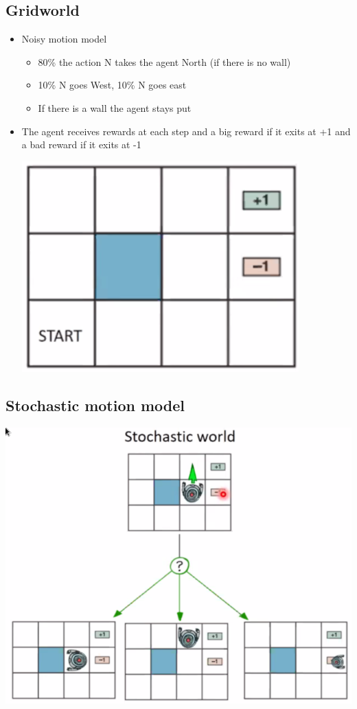 \documentclass[11pt]{article}
\begin{document}
\subsection{Gridworld}
\label{sec:orgb357dd0}
\begin{itemize}
\item Noisy motion model
\begin{itemize}
\item 80\% the action N takes the agent North (if there is no wall)
\item 10\% N goes West, 10\% N goes east
\item If there is a wall the agent stays put
\end{itemize}
\item The agent receives rewards at each step and a big reward if it exits at +1 and a bad reward if it exits at -1
\begin{center}
\includegraphics[width=.9\linewidth]{images/2020-09-03_17-54-54_screenshot.png}
\end{center}
\end{itemize}
\subsection{Stochastic motion model}
\label{sec:org61c2e1b}
\begin{center}
\includegraphics[width=.9\linewidth]{images/2020-09-03_17-58-54_screenshot.png}
\end{center}
\end{document}
